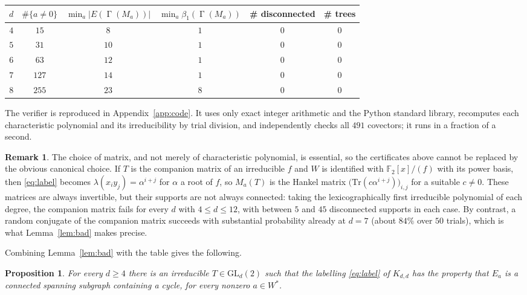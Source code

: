 \documentclass[11pt,reqno]{amsart}
\theoremstyle{plain}
\newtheorem{proposition}[theorem]{Proposition}
\theoremstyle{definition}
\newtheorem{remark}[theorem]{Remark}
\newcommand{\FF}{\mathbb{F}}
\newcommand{\GL}{\mathrm{GL}}
\DeclareMathOperator{\Gam}{\Gamma}
\begin{document}
\begin{center}
\begin{tabular}{cccccc}
\toprule
$d$ & $\#\{a\ne 0\}$ & $\min_{a}|E(\Gam(M_{a}))|$ & $\min_{a}\beta_{1}(\Gam(M_{a}))$ & \# disconnected & \# trees\\
\midrule
$4$ & $15$  & $8$  & $1$ & $0$ & $0$\\
$5$ & $31$  & $10$ & $1$ & $0$ & $0$\\
$6$ & $63$  & $12$ & $1$ & $0$ & $0$\\
$7$ & $127$ & $14$ & $1$ & $0$ & $0$\\
$8$ & $255$ & $23$ & $8$ & $0$ & $0$\\
\bottomrule
\end{tabular}
\end{center}

The verifier is reproduced in Appendix~\ref{app:code}. It uses only exact integer arithmetic and the Python standard library, recomputes each characteristic polynomial and its irreducibility by trial division, and independently checks all $491$ covectors; it runs in a fraction of a second.

\begin{remark}\label{rem:companion}
The choice of matrix, and not merely of characteristic polynomial, is essential, so the certificates above cannot be replaced by the obvious canonical choice. If $T$ is the companion matrix of an irreducible $f$ and $W$ is identified with $\FF_{2}[x]/(f)$ with its power basis, then \eqref{eq:label} becomes $\lambda(x_{i}y_{j})=\alpha^{i+j}$ for $\alpha$ a root of $f$, so $M_{a}(T)$ is the Hankel matrix $\bigl(\mathrm{Tr}(c\alpha^{i+j})\bigr)_{i,j}$ for a suitable $c\ne 0$. These matrices are always invertible, but their supports are not always connected: taking the lexicographically first irreducible polynomial of each degree, the companion matrix fails for every $d$ with $4\le d\le 12$, with between $5$ and $45$ disconnected supports in each case. By contrast, a random conjugate of the companion matrix succeeds with substantial probability already at $d=7$ (about $84\%$ over $50$ trials), which is what Lemma~\ref{lem:bad} makes precise.
\end{remark}

Combining Lemma~\ref{lem:bad} with the table gives the following.

\begin{proposition}\label{prop:base}
For every $d\ge 4$ there is an irreducible $T\in\GL_{d}(2)$ such that the labelling \eqref{eq:label} of $K_{d,d}$ has the property that $E_{a}$ is a connected spanning subgraph containing a cycle, for every nonzero $a\in W^{*}$.
\end{proposition}
\end{document}
